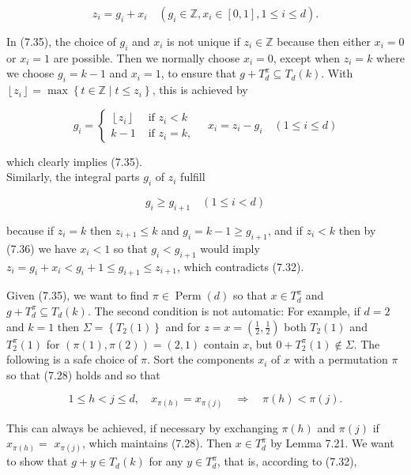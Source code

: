 \documentclass[12pt]{article}
\begin{document}
\begin{equation*}
z_{i}=g_{i}+x_{i} \quad\left(g_{i} \in \mathbb{Z}, x_{i} \in[0,1], 1 \leq i \leq d\right) . \tag{7.35}
\end{equation*}


In (7.35), the choice of $g_{i}$ and $x_{i}$ is not unique if $z_{i} \in \mathbb{Z}$ because then either $x_{i}=0$ or $x_{i}=1$ are possible. Then we normally choose $x_{i}=0$, except when $z_{i}=k$ where we choose $g_{i}=k-1$ and $x_{i}=1$, to ensure that $g+T_{d}^{\pi} \subseteq T_{d}(k)$. With $\left\lfloor z_{i}\right\rfloor=\max \left\{t \in \mathbb{Z} \mid t \leq z_{i}\right\}$, this is achieved by

\[
g_{i}=\left\{\begin{array}{ll}
\left\lfloor z_{i}\right\rfloor & \text { if } z_{i}<k  \tag{7.36}\\
k-1 & \text { if } z_{i}=k,
\end{array} \quad x_{i}=z_{i}-g_{i} \quad(1 \leq i \leq d)\right.
\]

which clearly implies (7.35).\\
Similarly, the integral parts $g_{i}$ of $z_{i}$ fulfill


\begin{equation*}
g_{i} \geq g_{i+1} \quad(1 \leq i<d) \tag{7.37}
\end{equation*}


because if $z_{i}=k$ then $z_{i+1} \leq k$ and $g_{i}=k-1 \geq g_{i+1}$, and if $z_{i}<k$ then by (7.36) we have $x_{i}<1$ so that $g_{i}<g_{i+1}$ would imply $z_{i}=g_{i}+x_{i}<g_{i}+1 \leq g_{i+1} \leq z_{i+1}$, which contradicts (7.32).

Given (7.35), we want to find $\pi \in \operatorname{Perm}(d)$ so that $x \in T_{d}^{\pi}$ and $g+T_{d}^{\pi} \subseteq T_{d}(k)$. The second condition is not automatic: For example, if $d=2$ and $k=1$ then $\Sigma=\left\{T_{2}(1)\right\}$ and for $z=x=\left(\frac{1}{2}, \frac{1}{2}\right)$ both $T_{2}(1)$ and $T_{2}^{\pi}(1)$ for $(\pi(1), \pi(2))=(2,1)$ contain $x$, but $0+T_{2}^{\pi}(1) \notin \Sigma$. The following is a safe choice of $\pi$. Sort the components $x_{i}$ of $x$ with a permutation $\pi$ so that (7.28) holds and so that


\begin{equation*}
1 \leq h<j \leq d, \quad x_{\pi(h)}=x_{\pi(j)} \quad \Rightarrow \quad \pi(h)<\pi(j) . \tag{7.38}
\end{equation*}


This can always be achieved, if necessary by exchanging $\pi(h)$ and $\pi(j)$ if $x_{\pi(h)}=$ $x_{\pi(j)}$, which maintains (7.28). Then $x \in T_{d}^{\pi}$ by Lemma 7.21. We want to show that $g+y \in T_{d}(k)$ for any $y \in T_{d}^{\pi}$, that is, according to (7.32),
\end{document}
